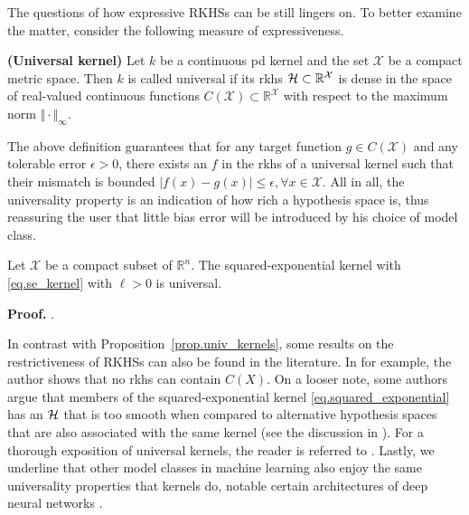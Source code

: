 The questions of how expressive RKHSs can be still lingers on. To better examine the matter, consider the following measure of expressiveness.

\begin{definition}
	\textbf{(Universal kernel)}
	\label{def.universal_kernel}
	Let $k$ be a continuous \ac{pd} kernel and the set $\mathcal{X}$ be a compact metric space. Then $k$ is called universal if its \ac{rkhs} $\mathcal{H} \subset \mathbb{R}^\mathcal{X}$ is dense in the space of real-valued continuous functions $C(\mathcal{X}) \subset \mathbb{R}^\mathcal{X}$ with respect to the maximum norm $\Vert \cdot \Vert_\infty$.
\end{definition}

The above definition guarantees that for any target function $g \in C(\mathcal{X})$ and any tolerable error $\epsilon > 0$, there exists an $f$ in the \ac{rkhs} of a universal kernel such that their mismatch is bounded $| f(x) - g(x) | \leq \epsilon, \forall x \in \mathcal{X}$.
All in all, the universality property is an indication of how rich a hypothesis space is, thus reassuring the user that little bias error will be introduced by his choice of model class.

\begin{proposition}
	\label{prop.univ_kernels}
	Let $\mathcal{X}$ be a compact subset of $\mathbb{R}^n$. The squared-exponential kernel with \eqref{eq.se_kernel} with $\ell >0$ is universal.
\end{proposition}

\begin{my_proof}
	\textbf{Proof.}
	\cite[Corollary~4.58]{steinwart2008svm_book}.
\end{my_proof}

In contrast with Proposition~\ref{prop.univ_kernels}, some results on the restrictiveness of RKHSs can also be found in the literature. In \cite{steinwart2020_no_rkhs_cont_func} for example, the author shows that no \ac{rkhs} can contain $C(X)$. On a looser note, some authors argue that members of the squared-exponential kernel \eqref{eq.squared_exponential} has an $\mathcal{H}$ that is too smooth when compared to alternative hypothesis spaces that are also associated with the same kernel (see the discussion in \cite[§4]{kanagawa2018gaussian}). For a thorough exposition of universal kernels, the reader is referred to \cite{micchelli2006universal}. Lastly, we underline that other model classes in machine learning also enjoy the same universality properties that kernels do, notable certain architectures of deep neural networks \citep{kidger2020universal}.

